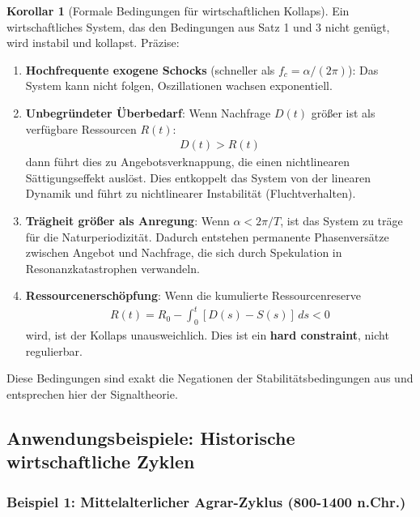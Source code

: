 \documentclass[a4paper,12pt,twoside]{report}
\theoremstyle{definition}
\newtheorem{korollar}{Korollar}
\begin{document}
\begin{korollar}[Formale Bedingungen für wirtschaftlichen Kollaps]

Ein wirtschaftliches System, das den Bedingungen aus Satz 1 und 3 nicht genügt, wird instabil und kollapst. Präzise:

\begin{enumerate}

\item \textbf{Hochfrequente exogene Schocks} (schneller als $f_c = \alpha/(2\pi)$): Das System kann nicht folgen, Oszillationen wachsen exponentiell.

\item \textbf{Unbegründeter Überbedarf}: Wenn Nachfrage $D(t)$ größer ist als verfügbare Ressourcen $R(t)$:
\begin{align}
D(t) > R(t)
\end{align}
dann führt dies zu Angebotsverknappung, die einen nichtlinearen Sättigungseffekt auslöst. Dies entkoppelt das System von der linearen Dynamik und führt zu nichtlinearer Instabilität (Fluchtverhalten).

\item \textbf{Trägheit größer als Anregung}: Wenn $\alpha < 2\pi/T$, ist das System zu träge für die Naturperiodizität. Dadurch entstehen permanente Phasenversätze zwischen Angebot und Nachfrage, die sich durch Spekulation in Resonanzkatastrophen verwandeln.

\item \textbf{Ressourcenerschöpfung}: Wenn die kumulierte Ressourcenreserve
\begin{align}
R(t) = R_0 - \int_0^t [D(s) - S(s)] \, ds < 0
\end{align}
wird, ist der Kollaps unausweichlich. Dies ist ein \textbf{hard constraint}, nicht regulierbar.

\end{enumerate}

Diese Bedingungen sind exakt die Negationen der Stabilitätsbedingungen aus \cite{epp_signal} und entsprechen hier der Signaltheorie.

\end{korollar}

\subsection{Anwendungsbeispiele: Historische wirtschaftliche Zyklen}

\subsubsection{Beispiel 1: Mittelalterlicher Agrar-Zyklus (800-1400 n.Chr.)}
\end{document}
